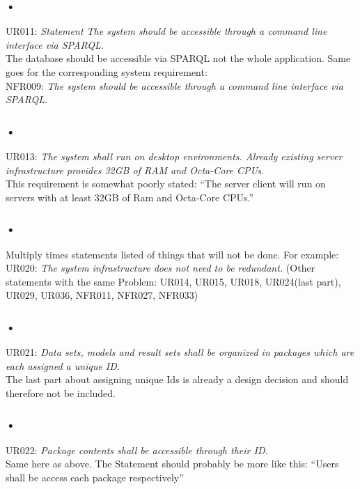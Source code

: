 \documentclass{article}
\begin{document}
\subsubsection{•}
UR011: \textit{Statement The system should be accessible through a command line interface via SPARQL.}\\
The database should be accessible via SPARQL not the whole application. Same goes for the corresponding system requirement:\\ 
NFR009: \textit{The system should be accessible through a command line interface via SPARQL.}
 
\subsubsection{•}
UR013: \textit{The system shall run on desktop environments. Already existing server infrastructure provides 32GB of RAM and Octa-Core CPUs.}\\
This requirement is somewhat poorly stated: “The server client will run on servers with at least 32GB of Ram and Octa-Core CPUs.”

\subsubsection{•}
Multiply times statements listed of things that will not be done. For example:\\
UR020: \textit{The system infrastructure does not need to be redundant.} (Other statements with the same Problem: UR014, UR015, UR018, UR024(last part), UR029, UR036, NFR011, NFR027, NFR033)

\subsubsection{•}
UR021: \textit{Data sets, models and result sets shall be organized in packages which are each assigned a unique ID.}\\
The last part about assigning unique Ids is already a design decision and should therefore not be included.

\subsubsection{•}
UR022: \textit{Package contents shall be accessible through their ID.}\\
Same here as above. The Statement should probably be more like this:
“Users shall be access each package respectively”
\end{document}
